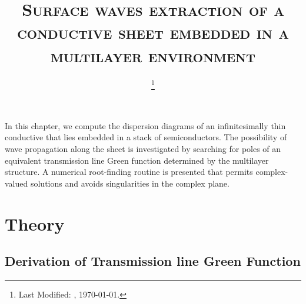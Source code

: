 \documentclass[12pt]{article}
\begin{document}
\title{\textsc{Surface waves extraction of a conductive sheet embedded in a multilayer environment}}

\date{\footnote{Last Modified: \currenttime, \today.}}

\maketitle





In this chapter, we compute the dispersion diagrams of an infinitesimally thin conductive that lies embedded in a stack of semiconductors. The possibility of wave propagation along the sheet is investigated by searching for poles of an equivalent transmission line Green function determined by the multilayer structure. A numerical root-finding routine is presented that permits complex-valued solutions and avoids singularities in the complex plane.

\section{Theory}


\subsection{Derivation of Transmission line Green Function}
\end{document}
